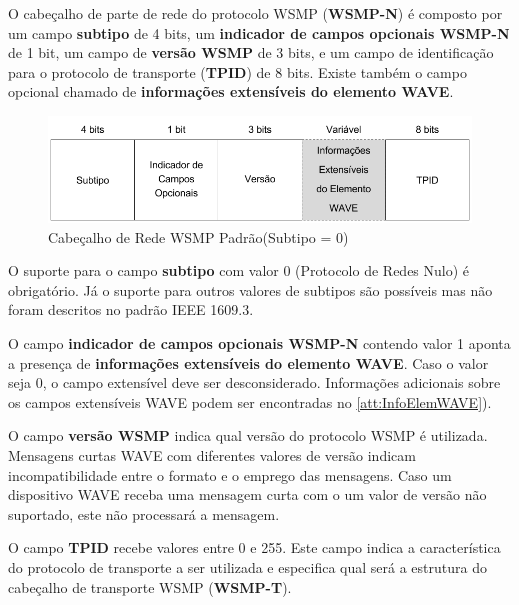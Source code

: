 \documentclass[
12pt,				%
openright,			%
oneside,			%
a4paper,			%
brazil,				%
]{abntex2}
\begin{document}
	\par O cabeçalho de parte de rede do protocolo WSMP (\textbf{WSMP-N}) é composto por um campo \textbf{subtipo} de 4 bits, um \textbf{indicador de campos opcionais WSMP-N} de 1 bit, um campo de \textbf{versão WSMP} de 3 bits, e um campo de identificação para o protocolo de transporte (\textbf{TPID}) de 8 bits. Existe também o campo opcional chamado de \textbf{informações extensíveis do elemento WAVE}.
	
	\begin{figure} [H]
		\centering
		\includegraphics[scale=.5]{figuras/cap3/30CabecalhoDeRedeWSMPPadrao(Subtipo0)}
		\caption{\label{fig_30}Cabeçalho de Rede WSMP Padrão(Subtipo = 0)}
	\end{figure}
	
	\par O suporte para o campo \textbf{subtipo} com valor 0 (Protocolo de Redes Nulo) é obrigatório. Já o suporte para outros valores de subtipos são possíveis mas não foram descritos no padrão IEEE 1609.3.
	
	\par O campo \textbf{indicador de campos opcionais WSMP-N} contendo valor 1 aponta a presença de \textbf{informações extensíveis do elemento WAVE}. Caso o valor seja 0, o campo extensível deve ser desconsiderado. Informações adicionais sobre os campos extensíveis WAVE podem ser encontradas no \autoref{att:InfoElemWAVE}).
	
	\par O campo \textbf{versão WSMP} indica qual versão do protocolo WSMP é utilizada. Mensagens curtas WAVE com diferentes valores de versão indicam incompatibilidade entre o formato e o emprego das mensagens. Caso um dispositivo WAVE receba uma mensagem curta com o um valor de  versão não suportado, este não processará a mensagem. 
	
	\par O campo \textbf{TPID} recebe valores entre 0 e 255. Este campo indica a característica do protocolo de transporte a ser utilizada e especifica qual será a estrutura do cabeçalho de transporte WSMP (\textbf{WSMP-T}).
	
\end{document}
